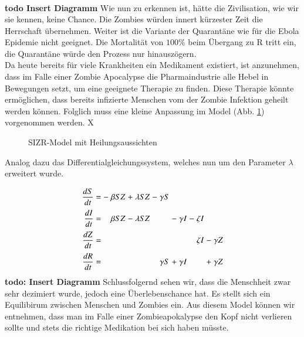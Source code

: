 \begin{refsection}
\[\begin{array}{rccrcrcrcrcr}
 \end{array}
\]
\textbf{todo Insert Diagramm}
Wie nun zu erkennen ist, hätte die Zivilisation, wie wir sie kennen, keine Chance. Die Zombies würden innert kürzester Zeit die Herrschaft übernehmen. Weiter ist die Variante der Quarantäne wie für die Ebola Epidemie nicht geeignet. Die Mortalität von $100 \%$ beim Übergang zu R tritt ein, die Quarantäne würde den Prozess nur hinauszögern.
\\
Da heute bereits für viele Krankheiten ein Medikament existiert, ist anzunehmen, dass im Falle einer Zombie Apocalypse die Pharmaindustrie alle Hebel in Bewegungen setzt, um eine geeignete Therapie zu finden. Diese Therapie könnte ermöglichen, dass bereits infizierte Menschen vom der Zombie Infektion geheilt werden können. Folglich muss eine kleine Anpassung im Model (Abb. \ref{fig:zombie_healing}) vorgenommen werden. X
\begin{figure}[ht]
  \centering
  
  \caption{SIZR-Model mit Heilungsaussichten}
  \label{fig:zombie_healing}
\end{figure}
Analog dazu das Differentialgleichungssystem, welches nun um den Parameter $\lambda$ erweitert wurde.
\[
\arraycolsep=1.4pt\def\arraystretch{2.2}
  \begin{array}{rccrcrcrcrcrcr}
   \displaystyle\frac{dS}{dt} & = &-& \beta S Z  &+& \lambda S Z   &-&  \gamma S & &         & & & & \\
   \displaystyle\frac{dI}{dt} & = & & \beta S Z  &-& \lambda S Z   & &           &-&\gamma I &-& \zeta I\\
   \displaystyle\frac{dZ}{dt} & = & &            & &               & &           & &         & & \zeta I  &-& \gamma Z \\   
   \displaystyle\frac{dR}{dt} & = & &            & &               & &  \gamma S &+&\gamma I & &          &+& \gamma Z \\

 \end{array}
\]
\textbf{todo: Insert Diagramm}
Schlussfolgernd sehen wir, dass die Menschheit zwar sehr dezimiert wurde, jedoch eine Überlebenschance hat. Es stellt sich ein Equilibirum zwischen Menschen und Zombies ein. Aus diesem Model können wir entnehmen, dass man im Falle einer Zombieapokalypse den Kopf nicht verlieren sollte und stets die richtige Medikation bei sich haben müsste.


\end{refsection}
